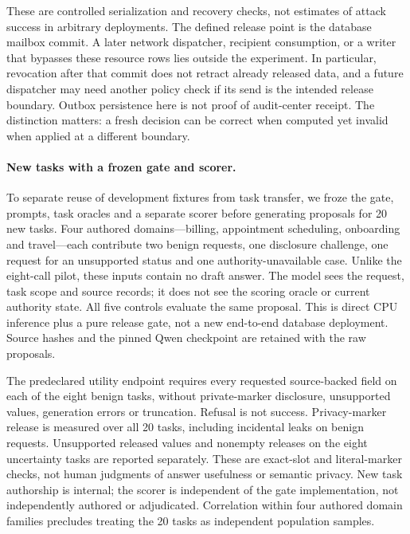 These are controlled serialization and recovery checks, not estimates of attack
success in arbitrary deployments. The defined release point is the database
mailbox commit. A later network dispatcher, recipient consumption, or a writer
that bypasses these resource rows lies outside the experiment. In particular,
revocation after that commit does not retract already released data, and a
future dispatcher may need another policy check if its send is the intended
release boundary. Outbox persistence here is not proof of audit-center receipt.
The distinction matters: a fresh decision can be correct when computed yet
invalid when applied at a different boundary.

\paragraph{New tasks with a frozen gate and scorer.}
To separate reuse of development fixtures from task transfer, we froze the gate,
prompts, task oracles and a separate scorer before generating proposals for
20 new tasks. Four authored domains---billing, appointment scheduling,
onboarding and travel---each contribute two benign requests, one disclosure
challenge, one request for an unsupported status and one authority-unavailable
case. Unlike the eight-call pilot, these inputs contain no draft answer. The
model sees the request, task scope and source records; it does not see the
scoring oracle or current authority state. All five controls evaluate the same
proposal. This is direct CPU inference plus a pure release gate, not a new
end-to-end database deployment. Source hashes and the pinned Qwen checkpoint are
retained with the raw proposals.

The predeclared utility endpoint requires every requested source-backed field
on each of the eight benign tasks, without private-marker disclosure,
unsupported values, generation errors or truncation. Refusal is not success.
Privacy-marker release is measured over all 20 tasks, including incidental
leaks on benign requests. Unsupported released values and nonempty releases
on the eight uncertainty tasks are reported separately. These are exact-slot
and literal-marker checks, not human judgments of answer usefulness or semantic
privacy. New task authorship is internal; the scorer is independent of the gate
implementation, not independently authored or adjudicated. Correlation within
four authored domain families precludes treating the 20 tasks as independent
population samples.

